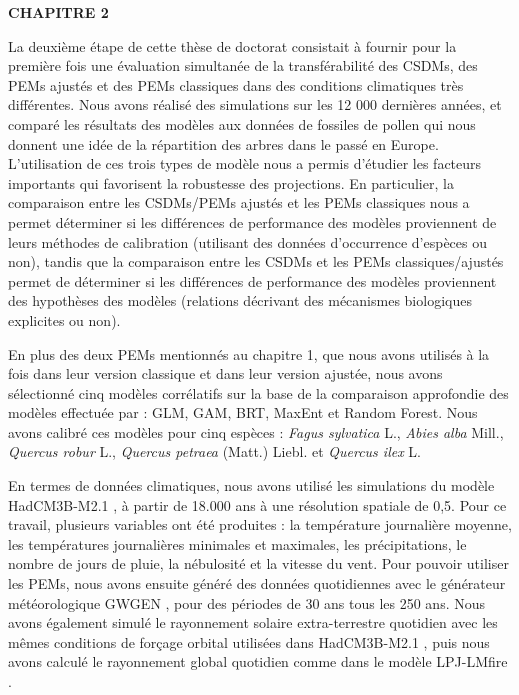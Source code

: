 \vspace*{1cm}
{\noindent\large\bfseries\sffamily CHAPITRE 2}

La deuxième étape de cette thèse de doctorat consistait à fournir pour la première fois une évaluation simultanée de la transférabilité des CSDMs, des PEMs ajustés et des PEMs classiques dans des conditions climatiques très différentes. Nous avons réalisé des simulations sur les 12 000 dernières années, et comparé les résultats des modèles aux données de fossiles de pollen qui nous donnent une idée de la répartition des arbres dans le passé en Europe. L'utilisation de ces trois types de modèle nous a permis d'étudier les facteurs importants qui favorisent la robustesse des projections. En particulier, la comparaison entre les CSDMs/PEMs ajustés et les PEMs classiques nous a permet déterminer si les différences de performance des modèles proviennent de leurs méthodes de calibration (utilisant des données d'occurrence d'espèces ou non), tandis que la comparaison entre les CSDMs et les PEMs classiques/ajustés permet de déterminer si les différences de performance des modèles proviennent des hypothèses des modèles (relations décrivant des mécanismes biologiques explicites ou non).

En plus des deux PEMs mentionnés au chapitre 1, que nous avons utilisés à la fois dans leur version classique et dans leur version ajustée, nous avons sélectionné cinq modèles corrélatifs sur la base de la comparaison approfondie des modèles effectuée par \cite{Valavi2022}: GLM, GAM, BRT, MaxEnt et Random Forest. Nous avons calibré ces modèles pour cinq espèces : \textit{Fagus sylvatica} L., \textit{Abies alba} Mill., \textit{Quercus robur} L., \textit{Quercus petraea}  (Matt.) Liebl. et \textit{Quercus ilex} L. 

En termes de données climatiques, nous avons utilisé les simulations du modèle HadCM3B-M2.1 \citep{Armstrong2019}, à partir de 18.000 ans à une résolution spatiale de 0,5\degree. Pour ce travail, plusieurs variables ont été produites : la température journalière moyenne, les températures journalières minimales et maximales, les précipitations, le nombre de jours de pluie, la nébulosité et la vitesse du vent. Pour pouvoir utiliser les PEMs, nous avons ensuite généré des données quotidiennes avec le générateur météorologique GWGEN \citep{Sommer2017}, pour des périodes de 30 ans tous les 250 ans. Nous avons également simulé le rayonnement solaire extra-terrestre quotidien avec les mêmes conditions de forçage orbital utilisées dans HadCM3B-M2.1 \citep{Armstrong2019}, puis nous avons calculé le rayonnement global quotidien comme dans le modèle LPJ-LMfire \citep{Pfeiffer2013}. 

